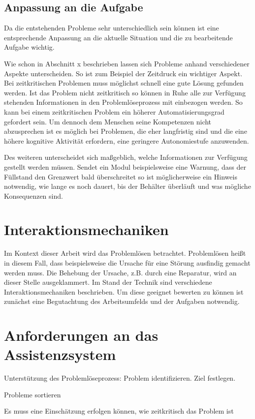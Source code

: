 \subsection{Anpassung an die Aufgabe}
Da die entstehenden Probleme sehr unterschiedlich sein können ist eine entsprechende Anpassung an die aktuelle Situation und die zu bearbeitende Aufgabe wichtig.

Wie schon in Abschnitt x beschrieben lassen sich Probleme anhand verschiedener Aspekte unterscheiden. So ist zum Beispiel der Zeitdruck ein wichtiger Aspekt. Bei zeitkritischen Problemen muss möglichst schnell eine gute Lösung gefunden werden. Ist das Problem nicht zeitkritisch so können in Ruhe alle zur Verfügung stehenden Informationen in den Problemlöseprozess mit einbezogen werden. So kann bei einem zeitkritischen Problem ein höherer Automatisierungsgrad gefordert sein. Um dennoch dem Menschen seine Kompetenzen nicht abzusprechen ist es möglich bei Problemen, die eher langfristig sind und die eine höhere kognitive Aktivität erfordern, eine geringere Autonomiestufe anzuwenden.

Des weiteren unterscheidet sich maßgeblich, welche Informationen zur Verfügung gestellt werden müssen. Sendet ein Modul beispielsweise eine Warnung, dass der Füllstand den Grenzwert bald überschreitet so ist möglicherweise ein Hinweis notwendig, wie lange es noch dauert, bis der Behälter überläuft und was mögliche Konsequenzen sind. 

\section{Interaktionsmechaniken}
Im Kontext dieser Arbeit wird das Problemlösen betrachtet. Problemlösen heißt in diesem Fall, dass beispielsweise die Ursache für eine Störung ausfindig gemacht werden muss. Die Behebung der Ursache, z.B. durch eine Reparatur, wird an dieser Stelle ausgeklammert. Im Stand der Technik sind verschiedene Interaktionsmechaniken beschrieben. Um diese geeignet bewerten zu können ist zunächst eine Begutachtung des Arbeitsumfelds und der Aufgaben notwendig. 

\section{Anforderungen an das Assistenzsystem}

Unterstützung des Problemlöseprozess: Problem identifizieren. Ziel festlegen.

Probleme sortieren

Es muss eine Einschätzung erfolgen können, wie zeitkritisch das Problem ist

